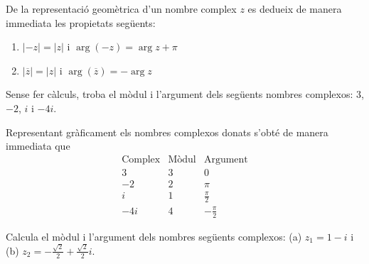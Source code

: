 De la representació geomètrica d’un nombre complex $z$ es dedueix de manera immediata les propietats següents:

\begin{enumerate}
\item[1)] $\left\vert -z\right\vert =\left\vert z\right\vert $ i $\arg
(-z)=\arg z+\pi $

\item[2)] $\left\vert \overline{z}\right\vert =\left\vert z\right\vert $ i $
\arg (\overline{z})=-\arg z$
\end{enumerate}

\begin{exemple}
Sense fer càlculs, troba el mòdul i l’argument dels següents
nombres complexos: $3$, $-2$, $i$ i $-4i$.
\end{exemple}

\begin{solucio}
Representant gràficament els nombres complexos donats s’obté de
manera immediata que
\begin{equation*}
\begin{array}{ccc}
\text{Complex} & \text{Mòdul} & \text{Argument} \\
3 & 3 & 0 \\
-2 & 2 & \pi \\
i & 1 & \frac{\pi }{2} \\
-4i & 4 & -\frac{\pi }{2}
\end{array}
\end{equation*}
\end{solucio}

\begin{exemple}
Calcula el mòdul i l’argument dels nombres següents
complexos: (a) $z_{1}=1-i$ i (b) $z_{2}=-\frac{\sqrt{2}}{2}+\frac{\sqrt{2}}{2
}i$.
\end{exemple}

